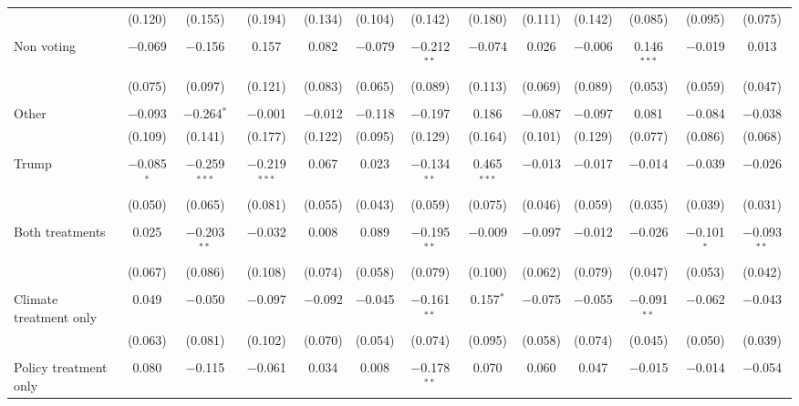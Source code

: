 \begin{tabular}{@{\extracolsep{5pt}}lcccccccccccc}
  & (0.120) & (0.155) & (0.194) & (0.134) & (0.104) & (0.142) & (0.180) & (0.111) & (0.142) & (0.085) & (0.095) & (0.075) \\ 
  & & & & & & & & & & & & \\ 
 Non voting & $-$0.069 & $-$0.156 & 0.157 & 0.082 & $-$0.079 & $-$0.212$^{**}$ & $-$0.074 & 0.026 & $-$0.006 & 0.146$^{***}$ & $-$0.019 & 0.013 \\ 
  & (0.075) & (0.097) & (0.121) & (0.083) & (0.065) & (0.089) & (0.113) & (0.069) & (0.089) & (0.053) & (0.059) & (0.047) \\ 
  & & & & & & & & & & & & \\ 
 Other & $-$0.093 & $-$0.264$^{*}$ & $-$0.001 & $-$0.012 & $-$0.118 & $-$0.197 & 0.186 & $-$0.087 & $-$0.097 & 0.081 & $-$0.084 & $-$0.038 \\ 
  & (0.109) & (0.141) & (0.177) & (0.122) & (0.095) & (0.129) & (0.164) & (0.101) & (0.129) & (0.077) & (0.086) & (0.068) \\ 
  & & & & & & & & & & & & \\ 
 Trump & $-$0.085$^{*}$ & $-$0.259$^{***}$ & $-$0.219$^{***}$ & 0.067 & 0.023 & $-$0.134$^{**}$ & 0.465$^{***}$ & $-$0.013 & $-$0.017 & $-$0.014 & $-$0.039 & $-$0.026 \\ 
  & (0.050) & (0.065) & (0.081) & (0.055) & (0.043) & (0.059) & (0.075) & (0.046) & (0.059) & (0.035) & (0.039) & (0.031) \\ 
  & & & & & & & & & & & & \\ 
 Both treatments & 0.025 & $-$0.203$^{**}$ & $-$0.032 & 0.008 & 0.089 & $-$0.195$^{**}$ & $-$0.009 & $-$0.097 & $-$0.012 & $-$0.026 & $-$0.101$^{*}$ & $-$0.093$^{**}$ \\ 
  & (0.067) & (0.086) & (0.108) & (0.074) & (0.058) & (0.079) & (0.100) & (0.062) & (0.079) & (0.047) & (0.053) & (0.042) \\ 
  & & & & & & & & & & & & \\ 
 Climate treatment only & 0.049 & $-$0.050 & $-$0.097 & $-$0.092 & $-$0.045 & $-$0.161$^{**}$ & 0.157$^{*}$ & $-$0.075 & $-$0.055 & $-$0.091$^{**}$ & $-$0.062 & $-$0.043 \\ 
  & (0.063) & (0.081) & (0.102) & (0.070) & (0.054) & (0.074) & (0.095) & (0.058) & (0.074) & (0.045) & (0.050) & (0.039) \\ 
  & & & & & & & & & & & & \\ 
 Policy treatment only & 0.080 & $-$0.115 & $-$0.061 & 0.034 & 0.008 & $-$0.178$^{**}$ & 0.070 & 0.060 & 0.047 & $-$0.015 & $-$0.014 & $-$0.054 \\ 

\end{tabular}
